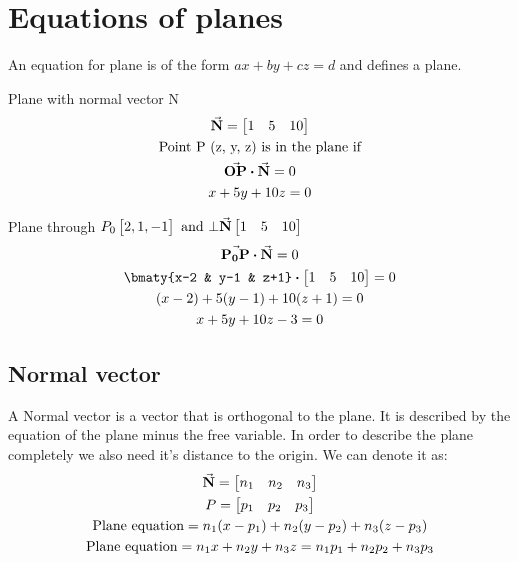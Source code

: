 \documentclass{article}
\begin{document}
    \section{Equations of planes}
    An equation for plane is of the form $ax+by+cz=d$ and defines a plane.

    \begin{example}
        Plane with normal vector N
        \begin{gather*}
            \va{N} = \bmqty{1 & 5 & 10}\\
            \text{Point P (z, y, z) is in the plane if}\\
            \va{OP}\vdot\va{N}=0\\
            x + 5y + 10z=0
        \end{gather*}
    \end{example}

    \begin{example}
        Plane through $P_0 \bmqty{2, 1, -1} \text{ and } \bot \va{N} \bmqty{1 & 5 & 10}$\\
        \begin{gather*}
            \va{P_0 P}\vdot \va{N}=0\\
            \bmaty{x-2 & y-1 & z+1}\vdot\bmqty{1 & 5 & 10}=0\\
            (x-2) + 5(y-1) + 10(z+1) = 0 \\
            x + 5y + 10z -3 = 0
        \end{gather*}
    \end{example}

    \subsection{Normal vector}
    A Normal vector is a vector that is orthogonal to the plane. It is described by the equation of the plane minus the free variable. In order to describe the plane completely we also need it's distance to the origin. We can denote it as:\\
    \begin{gather*}
        \va{N}=\bmqty{n_1 & n_2 & n_3}\\
        P = \bmqty{p_1 & p_2 & p_3}\\
        \text{Plane equation}=n_1 (x - p_1 ) + n_2 (y - p_2 ) + n_3 (z - p_3)\\
        \text{Plane equation}=n_1 x + n_2 y + n_3 z = n_1 p_1 + n_2 p_2 + n_3 p_3\\
    \end{gather*}
\end{document}
